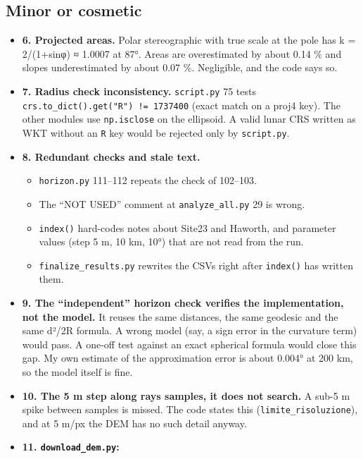 \documentclass[11pt,a4paper]{article}
\providecommand{\tightlist}{\setlength{\itemsep}{0pt}\setlength{\parskip}{0pt}}
\begin{document}
\hypertarget{minor-or-cosmetic}{%
\subsection{Minor or cosmetic}\label{minor-or-cosmetic}}

\begin{itemize}
\tightlist
\item
  \textbf{6. Projected areas.} Polar stereographic with true scale at
  the pole has k = 2/(1+sin\textbar φ\textbar) ≈ 1.0007 at 87°. Areas
  are overestimated by about 0.14 \% and slopes underestimated by about
  0.07 \%. Negligible, and the code says so.
\item
  \textbf{7. Radius check inconsistency.}
  \texttt{script.py} 75 tests
  \texttt{crs.to\_dict().get("R") != 1737400} (exact
  match on a proj4 key). The other modules use
  \texttt{np.isclose} on the ellipsoid. A valid lunar
  CRS written as WKT without an \texttt{R} key would be
  rejected only by \texttt{script.py}.
\item
  \textbf{8. Redundant checks and stale text.}

  \begin{itemize}
  \tightlist
  \item
    \texttt{horizon.py} 111--112 repeats the check of
    102--103.
  \item
    The ``NOT USED'' comment at
    \texttt{analyze\_all.py} 29 is wrong.
  \item
    \texttt{index()} hard-codes notes about Site23 and
    Haworth, and parameter values (step 5 m, 10 km, 10°) that are not
    read from the run.
  \item
    \texttt{finalize\_results.py} rewrites the CSVs
    right after \texttt{index()} has written them.
  \end{itemize}
\item
  \textbf{9. The ``independent'' horizon check verifies the
  implementation, not the model.} It reuses the same distances, the same
  geodesic and the same d²/2R formula. A wrong model (say, a sign error
  in the curvature term) would pass. A one-off test against an exact
  spherical formula would close this gap. My own estimate of the
  approximation error is about 0.004° at 200 km, so the model itself is
  fine.
\item
  \textbf{10. The 5 m step along rays samples, it does not search.} A
  sub-5 m spike between samples is missed. The code states this
  (\texttt{limite\_risoluzione}), and at 5 m/px the DEM
  has no such detail anyway.
\item
  \textbf{11. \texttt{download\_dem.py}:}


\end{itemize}
\end{document}
